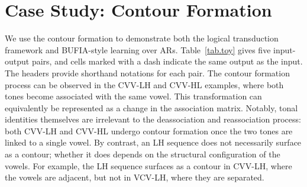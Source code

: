 \documentclass[pmlr]{jmlr}%
\begin{document}
	\section{Case Study: Contour Formation}
	We use the contour formation to demonstrate both the logical 
	transduction framework and BUFIA-style learning over ARs.
	Table~\ref{tab.toy} gives five input-output pairs, and cells 
	marked with a dash indicate the same output as the input. 
	The headers provide shorthand notations for each pair. 
	The contour formation process can be observed in the CVV-LH 
	and CVV-HL examples, where both tones become associated with 
	the same vowel. This transformation can equivalently be 
	represented as a change in the association matrix. Notably, 
	tonal identities themselves are irrelevant to the deassociation 
	and reassociation process: both CVV-LH and CVV-HL undergo contour 
	formation once the two tones are linked to a single vowel. 
	By contrast, an LH sequence does not necessarily surface as 
	a contour; whether it does depends on the structural 
	configuration of the vowels. For example, the LH sequence 
	surfaces as a contour in CVV-LH, where the vowels are adjacent, 
	but not in VCV-LH, where they are separated.
	
	
	
\end{document}
